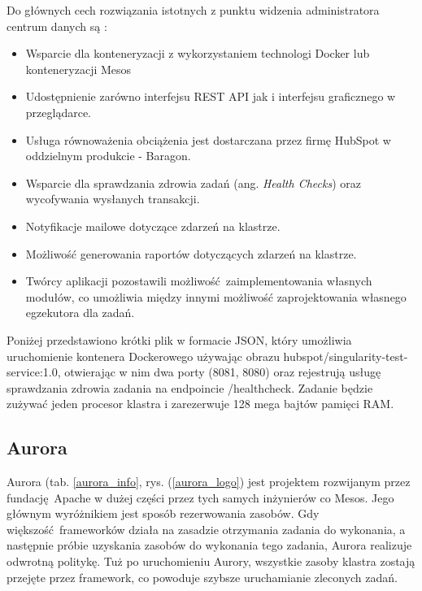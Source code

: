 \documentclass[10pt,a4paper,titlepage,twoside]{report}
\begin{document}
Do głównych cech rozwiązania istotnych z punktu widzenia administratora centrum danych są \cite{ad42}:
\begin{itemize}
\item Wsparcie dla konteneryzacji z wykorzystaniem technologi Docker lub konteneryzacji Mesos
\item Udostępnienie zarówno interfejsu REST API jak i interfejsu graficznego w przeglądarce. 
\item Usługa równoważenia obciążenia jest dostarczana przez firmę HubSpot w oddzielnym produkcie - Baragon.
\item Wsparcie dla sprawdzania zdrowia zadań (ang. \textit{Health Checks}) oraz wycofywania wysłanych transakcji.
\item Notyfikacje mailowe dotyczące zdarzeń na klastrze.
\item Możliwość generowania raportów dotyczących zdarzeń na klastrze.
\item Twórcy aplikacji pozostawili możliwość zaimplementowania własnych modułów, co umożliwia między innymi możliwość zaprojektowania własnego egzekutora dla zadań. 
\end{itemize}

Poniżej przedstawiono krótki plik w formacie JSON, który umożliwia uruchomienie kontenera Dockerowego używając obrazu hubspot/singularity-test-service:1.0, otwierając w nim dwa porty (8081, 8080) oraz rejestrują usługę sprawdzania zdrowia zadania na endpoincie /healthcheck. Zadanie będzie zużywać jeden procesor klastra i zarezerwuje 128 mega bajtów pamięci RAM.



\subsection{Aurora}
Aurora (tab. \ref{aurora_info}, rys. (\ref{aurora_logo}) jest projektem rozwijanym przez fundację Apache w dużej części przez tych samych inżynierów co Mesos. Jego głównym wyróżnikiem jest sposób rezerwowania zasobów. Gdy większość frameworków działa na zasadzie otrzymania zadania do wykonania, a następnie próbie uzyskania zasobów do wykonania tego zadania, Aurora realizuje odwrotną politykę. Tuż po uruchomieniu Aurory, wszystkie zasoby klastra zostają przejęte przez framework, co powoduje szybsze uruchamianie zleconych zadań.
\end{document}
